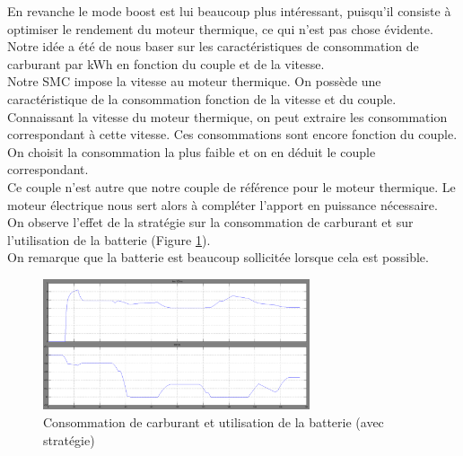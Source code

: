 En revanche le mode boost est lui beaucoup plus intéressant, puisqu'il consiste à optimiser le rendement du moteur thermique, ce qui n'est pas chose évidente.\\
Notre idée a été de nous baser sur les caractéristiques de consommation de carburant par kWh en fonction du couple et de la vitesse.\\
Notre SMC impose la vitesse au moteur thermique. On possède une caractéristique de la consommation fonction de la vitesse et du couple. Connaissant la vitesse du moteur thermique, on peut extraire les consommation correspondant à cette vitesse. Ces consommations sont encore fonction du couple.\\
On choisit la consommation la plus faible et on en déduit le couple correspondant.\\
Ce couple n'est autre que notre couple de référence pour le moteur thermique.
Le moteur électrique nous sert alors à compléter l'apport en puissance nécessaire.\\

On observe l'effet de la stratégie sur la consommation de carburant et sur l'utilisation de la batterie (Figure \ref{img:liter_optimisation}).\\ On remarque que la batterie est beaucoup sollicitée lorsque cela est possible.\\

\begin{figure}[ht]
\begin{center}
	\includegraphics[width=0.7\textwidth]{images/liter_optimisation}
	\caption{Consommation de carburant et utilisation de la batterie (avec stratégie)}\label{img:liter_optimisation}
\end{center}
\end{figure}
\FloatBarrier